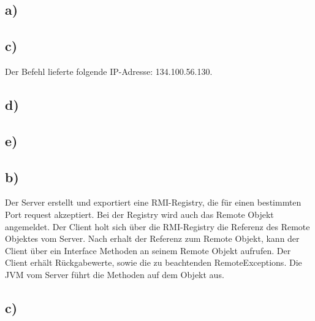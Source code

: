 \documentclass[ngerman]{fbi-aufgabenblatt}
\begin{document}
	\setcounter{section}{0}

	
	
	\subsection*{a)}
	
	\subsection*{c)}

  Der Befehl 
  lieferte folgende IP-Adresse: 134.100.56.130.
  \newline

	\subsection*{d)}

	\subsection*{e)}

	
	\subsection*{b)}
  Der Server erstellt und exportiert eine RMI-Registry, die für einen bestimmten 
  Port request akzeptiert. Bei der Registry wird auch das Remote Objekt
  angemeldet.  Der Client holt sich über die RMI-Registry die Referenz des
  Remote Objektes vom Server. Nach erhalt der Referenz zum Remote Objekt,
  kann der Client über ein Interface Methoden an seinem Remote Objekt aufrufen.
  Der Client erhält Rückgabewerte, sowie die zu beachtenden RemoteExceptions.
  Die JVM vom Server führt die Methoden auf dem Objekt aus.

	\subsection*{c)}
\end{document}
